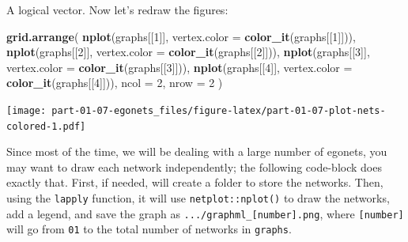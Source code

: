 \documentclass[
]{book}
\newenvironment{Shaded}{\begin{snugshade}}{\end{snugshade}}
\newcommand{\AttributeTok}[1]{\textcolor[rgb]{0.13,0.29,0.53}{#1}}
\newcommand{\DecValTok}[1]{\textcolor[rgb]{0.00,0.00,0.81}{#1}}
\newcommand{\FunctionTok}[1]{\textcolor[rgb]{0.13,0.29,0.53}{\textbf{#1}}}
\newcommand{\NormalTok}[1]{#1}
\begin{document}
A logical vector. Now let's redraw the figures:

\begin{Shaded}
\begin{Highlighting}[]
\FunctionTok{grid.arrange}\NormalTok{(}
  \FunctionTok{nplot}\NormalTok{(graphs[[}\DecValTok{1}\NormalTok{]], }\AttributeTok{vertex.color =} \FunctionTok{color\_it}\NormalTok{(graphs[[}\DecValTok{1}\NormalTok{]])),}
  \FunctionTok{nplot}\NormalTok{(graphs[[}\DecValTok{2}\NormalTok{]], }\AttributeTok{vertex.color =} \FunctionTok{color\_it}\NormalTok{(graphs[[}\DecValTok{2}\NormalTok{]])),}
  \FunctionTok{nplot}\NormalTok{(graphs[[}\DecValTok{3}\NormalTok{]], }\AttributeTok{vertex.color =} \FunctionTok{color\_it}\NormalTok{(graphs[[}\DecValTok{3}\NormalTok{]])),}
  \FunctionTok{nplot}\NormalTok{(graphs[[}\DecValTok{4}\NormalTok{]], }\AttributeTok{vertex.color =} \FunctionTok{color\_it}\NormalTok{(graphs[[}\DecValTok{4}\NormalTok{]])),}
  \AttributeTok{ncol =} \DecValTok{2}\NormalTok{, }\AttributeTok{nrow =} \DecValTok{2}
\NormalTok{)}
\end{Highlighting}
\end{Shaded}

\texttt{[image: part-01-07-egonets\_files/figure-latex/part-01-07-plot-nets-colored-1.pdf]}

Since most of the time, we will be dealing with a large number of egonets, you may want to draw each network independently; the following code-block does exactly that. First, if needed, will create a folder to store the networks. Then, using the \texttt{lapply} function, it will use \texttt{netplot::nplot()} to draw the networks, add a legend, and save the graph as \texttt{.../graphml\_{[}number{]}.png}, where \texttt{{[}number{]}} will go from \texttt{01} to the total number of networks in \texttt{graphs}.
\end{document}
